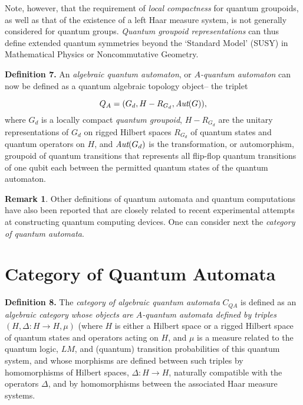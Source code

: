 \documentclass[12pt]{article}
\theoremstyle{plain}
\theoremstyle{definition}
\newtheorem{remark}{Remark}[section]
\numberwithin{equation}{section}
\begin{document}
Note, however, that the requirement of \emph{local compactness} for quantum groupoids, as well as that of the existence of a left Haar measure system,  is not generally considered for quantum groups. \emph{Quantum groupoid representations} can thus define extended quantum symmetries beyond the `Standard Model' (SUSY) in Mathematical Physics or Noncommutative Geometry.
\bigbreak

\textbf{Definition 7.}
An \emph{ algebraic quantum automaton}, or \emph{$A$-quantum automaton} can now be defined as a quantum algebraic topology object-- the triplet

 \begin{equation}Q_A = (G_d,H-R_{G_d}, \emph{Aut}(G)), \end{equation}
where $G_d$ is a locally compact \emph{quantum groupoid}, $H-R_{G_d}$ are the unitary representations of $G_d$ on rigged Hilbert spaces $R_{G_d}$ of quantum states and quantum operators on $H$, and $ \emph{Aut}(G_d)$ is the transformation, or automorphism, groupoid of quantum transitions that represents all flip-flop quantum transitions of one qubit each between the permitted quantum states of the quantum automaton.

\begin{remark}
Other definitions of quantum automata and quantum computations have also been reported that are closely related to recent experimental attempts at constructing quantum computing devices. One can consider next the \emph{category of quantum automata}.
\end{remark}


\section{Category of Quantum Automata}

{\bf Definition 8.}
The \emph{category of algebraic quantum automata} $C_{QA}$
is defined as an {\em algebraic category whose  objects are $A$-quantum automata defined by triples} $(H, \Delta: H \rightarrow H, \mu)$ (where $H$ is either a Hilbert space or a rigged Hilbert space of quantum states and operators acting on $H$, and $\mu$ is a measure related to the quantum logic, $LM$, and (quantum) transition probabilities of this quantum system, and whose morphisms are defined between such triples by homomorphisms of Hilbert spaces, $\Delta: H \rightarrow H$, naturally compatible with the operators $\Delta$, and by homomorphisms between the associated Haar measure systems.
\end{document}
